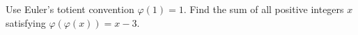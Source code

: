 Use Euler's totient convention $\varphi(1)=1$. Find the sum of all positive integers $x$ satisfying $\varphi(\varphi(x))=x-3$.
